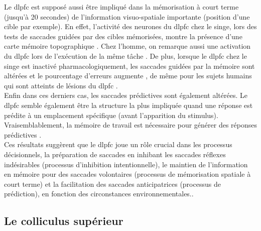 Le \gls{dlpfc} est supposé aussi être impliqué dans la mémorisation à court terme (jusqu'à 20 secondes) de l'information visuo-spatiale importante (position d'une cible par exemple). En effet, l'activité des neurones du \gls{dlpfc} chez le singe, lors des tests de saccades guidées par des cibles mémorisées, montre la présence d'une carte mémoire topographique \cite{Sawaguchi:2001}. Chez l'homme, on remarque aussi une activation du \gls{dlpfc} lors de l'exécution de la même tâche \cite{Sweeney:1996}. De plus, lorsque le \gls{dlpfc} chez le singe est inactivé pharmacologiquement, les saccades guidées par la mémoire sont altérées et le pourcentage d'erreurs augmente \cite{Sawaguchi:1994}, de même pour les sujets humains qui sont atteints de lésions du \gls{dlpfc} \cite{Pierrot:2003} .\\

Enfin dans ces derniers cas, les saccades prédictives sont également altérées. Le \gls{dlpfc} semble également être la structure la plus impliquée quand une réponse est prédite à un emplacement spécifique (avant l'apparition du stimulus). Vraisemblablement, la mémoire de travail est nécessaire pour générer des réponses prédictives \cite{Pierrot:2003}.\\

Ces résultats suggèrent que le \gls{dlpfc} joue un rôle crucial dans les processus décisionnels, la préparation de saccades en inhibant les saccades réflexes indésirables (processus d'inhibition intentionnelle), le maintien  de l'information en mémoire pour des saccades volontaires (processus de mémorisation spatiale à court terme) et la facilitation des saccades anticipatrices (processus de prédiction), en fonction des circonstances environnementales.\cite{Pierrot:2003, Leigh:2006}.\\








\subsection{Le colliculus supérieur}




